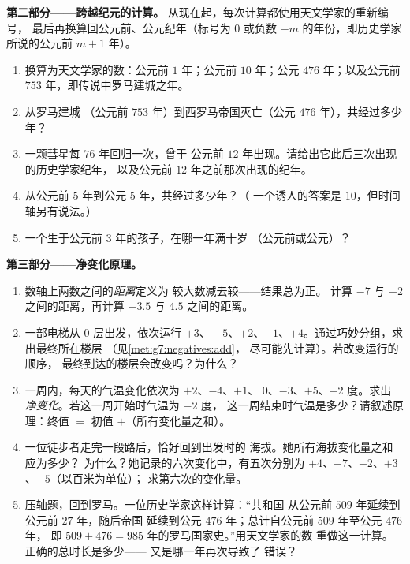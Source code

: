 \begin{problem}
\medskip
\noindent\textbf{第二部分——跨越纪元的计算。}
从现在起，每次计算都使用天文学家的重新编号，
最后再换算回公元前、公元纪年（标号为
$0$ 或负数 $-m$ 的年份，即历史学家所说的公元前 $m + 1$ 年）。
\begin{enumerate}[resume]
  \item 换算为天文学家的数：公元前 $1$ 年；公元前 $10$ 年；公元
        $476$ 年；以及公元前 $753$ 年，即传说中罗马建城之年。
  \item 从罗马建城
        （公元前 $753$ 年）到西罗马帝国灭亡（公元 $476$ 年），共经过多少年？
  \item 一颗彗星每 $76$ 年回归一次，曾于
        公元前 $12$ 年出现。请给出它此后三次出现的历史学家纪年，
        以及公元前 $12$ 年之前那次出现的纪年。
  \item 从公元前 $5$ 年到公元 $5$ 年，共经过多少年？（
        一个诱人的答案是 $10$，但时间轴另有说法。）
  \item 一个生于公元前 $3$ 年的孩子，在哪一年满十岁
        （公元前或公元）？
\end{enumerate}

\medskip
\noindent\textbf{第三部分——净变化原理。}
\begin{enumerate}[resume]
  \item 数轴上两数之间的\emph{距离}定义为
        较大数减去较——结果总为正。
        计算 $-7$ 与 $-2$ 之间的距离，再计算
        $-3.5$ 与 $4.5$ 之间的距离。
  \item 一部电梯从 $0$ 层出发，依次运行 $+3$、
        $-5$、$+2$、$-1$、$+4$。通过巧妙分组，求出最终所在楼层
        （见\cref{met:g7:negatives:add}，
        尽可能先计算）。若改变运行的顺序，
        最终到达的楼层会改变吗？为什么？
  \item 一周内，每天的气温变化依次为 $+2$、$-4$、$+1$、
        $0$、$-3$、$+5$、$-2$ 度。求出
        \emph{净变化}。若这一周开始时气温为 $-2$ 度，
        这一周结束时气温是多少？请叙述原理：终值 $=$
        初值 $+$（所有变化量之和）。
  \item 一位徒步者走完一段路后，恰好回到出发时的
        海拔。她所有海拔变化量之和应为多少？
        为什么？她记录的六次变化中，有五次分别为
        $+4$、$-7$、$+2$、$+3$、$-5$（以百米为单位）；
        求第六次的变化量。
  \item 压轴题，回到罗马。一位历史学家这样计算：“共和国
        从公元前 $509$ 年延续到公元前 $27$ 年，随后帝国
        延续到公元 $476$ 年；总计自公元前 $509$ 年至公元 $476$ 年，
        即 $509 + 476 = 985$ 年的罗马国家史。”用天文学家的数
        重做这一计算。正确的总时长是多少——
        又是哪一年再次导致了
        错误？
\end{enumerate}
\end{problem}
